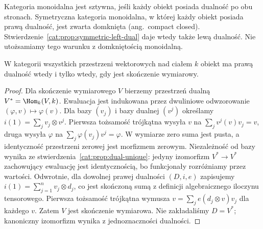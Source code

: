\begin{definicja}\label{cat:def:rigid-compact}
Kategoria monoidalna jest sztywna, jeśli każdy obiekt posiada dualność po obu stronach. Symetryczna kategoria monoidalna, w której każdy obiekt posiada prawą dualność, jest zwarta domknięta (ang.\ compact closed). Stwierdzenie~\ref{cat:prop:symmetric-left-dual} daje wtedy także lewą dualność. Nie utożsamiamy tego warunku z domkniętością monoidalną.
\end{definicja}
\begin{twierdzenie}\label{cat:thm:vect-dualizable}
W kategorii wszystkich przestrzeni wektorowych nad ciałem $k$ obiekt ma prawą dualność wtedy i tylko wtedy, gdy jest skończenie wymiarowy.
\end{twierdzenie}
\begin{proof}
Dla skończenie wymiarowego $V$ bierzemy przestrzeń dualną $V^*=\Hom_k(V,k)$. Ewaluacja jest indukowana przez dwuliniowe odwzorowanie $(\varphi,v)\mapsto\varphi(v)$. Dla bazy $(v_j)$ i bazy dualnej $(v^j)$ określamy $i(1)=\sum_j v_j\otimes v^j$. Pierwsza tożsamość trójkątna wysyła $v$ na $\sum_jv^j(v)v_j=v$, druga wysyła $\varphi$ na $\sum_j\varphi(v_j)v^j=\varphi$. W wymiarze zero suma jest pusta, a identyczność przestrzeni zerowej jest morfizmem zerowym. Niezależność od bazy wynika ze stwierdzenia~\ref{cat:prop:dual-unique}: jedyny izomorfizm $V^*\to V^*$ zachowujący ewaluację jest identycznością, bo funkcjonały rozróżniamy przez wartości.
Odwrotnie, dla dowolnej prawej dualności $(D,i,e)$ zapisujemy $i(1)=\sum_{j=1}^n v_j\otimes d_j$, co jest skończoną sumą z definicji algebraicznego iloczynu tensorowego. Pierwsza tożsamość trójkątna wymusza
$v=\sum_j e(d_j\otimes v)v_j$ dla każdego $v$. Zatem $V$ jest skończenie wymiarowa. Nie zakładaliśmy $D=V^*$; kanoniczny izomorfizm wynika z jednoznaczności dualności.
\end{proof}

